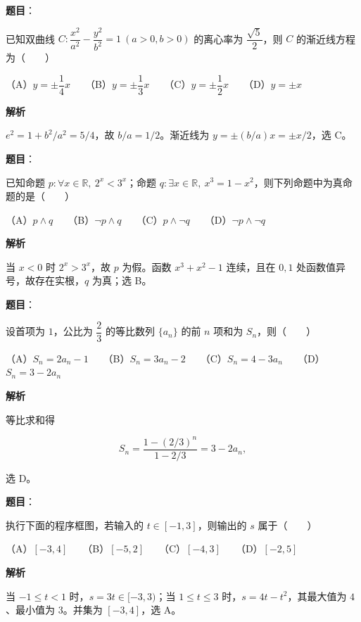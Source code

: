 \begin{answer}

\textbf{题目}：

已知双曲线 $C:\dfrac{x^2}{a^2}-\dfrac{y^2}{b^2}=1\ (a>0,b>0)$ 的离心率为 $\dfrac{\sqrt5}{2}$，则 $C$ 的渐近线方程为\mbox{（　　）}

（A）$y=\pm\dfrac14x$　　（B）$y=\pm\dfrac13x$　　（C）$y=\pm\dfrac12x$　　（D）$y=\pm x$

\textbf{解析}

$e^2=1+b^2/a^2=5/4$，故 $b/a=1/2$。渐近线为 $y=\pm(b/a)x=\pm x/2$，选 C。


\end{answer}
\begin{answer}

\textbf{题目}：

已知命题 $p:\forall x\in\mathbb R,\ 2^x<3^x$；命题 $q:\exists x\in\mathbb R,\ x^3=1-x^2$，则下列命题中为真命题的是\mbox{（　　）}

（A）$p\land q$　　（B）$\neg p\land q$　　（C）$p\land\neg q$　　（D）$\neg p\land\neg q$

\textbf{解析}

当 $x<0$ 时 $2^x>3^x$，故 $p$ 为假。函数 $x^3+x^2-1$ 连续，且在 $0,1$ 处函数值异号，故存在实根，$q$ 为真；选 B。


\end{answer}
\begin{answer}

\textbf{题目}：

设首项为 $1$，公比为 $\dfrac23$ 的等比数列 $\{a_n\}$ 的前 $n$ 项和为 $S_n$，则\mbox{（　　）}

（A）$S_n=2a_n-1$　　（B）$S_n=3a_n-2$　　（C）$S_n=4-3a_n$　　（D）$S_n=3-2a_n$

\textbf{解析}

等比求和得

\nopagebreak[4]
\[
S_n=\frac{1-(2/3)^n}{1-2/3}=3-2a_n,
\]

选 D。


\end{answer}
\begin{answer}

\textbf{题目}：

执行下面的程序框图，若输入的 $t\in[-1,3]$，则输出的 $s$ 属于\mbox{（　　）}
\nopagebreak[4]
\begin{center}\end{center}
\nopagebreak[4]
（A）$[-3,4]$　　（B）$[-5,2]$　　（C）$[-4,3]$　　（D）$[-2,5]$

\textbf{解析}

当 $-1\leqslant t<1$ 时，$s=3t\in[-3,3)$；当 $1\leqslant t\leqslant3$ 时，$s=4t-t^2$，其最大值为 $4$、最小值为 $3$。并集为 $[-3,4]$，选 A。


\end{answer}
